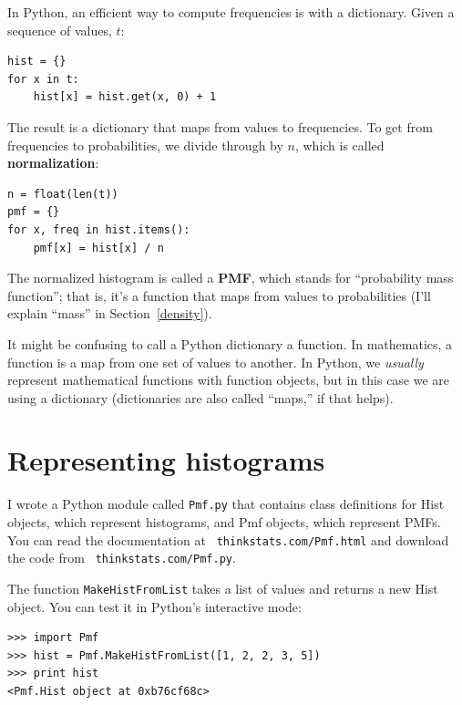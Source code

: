 \documentclass[12pt]{book}
\begin{document}

In Python, an efficient way to compute frequencies is with a dictionary.
Given a sequence of values, $t$:

\begin{verbatim}
hist = {}
for x in t:
    hist[x] = hist.get(x, 0) + 1
\end{verbatim}

The result is a dictionary that maps from values to frequencies.
To get from frequencies to probabilities, we divide through by $n$,
which is called {\bf normalization}:


\begin{verbatim}
n = float(len(t))
pmf = {}
for x, freq in hist.items():
    pmf[x] = hist[x] / n
\end{verbatim}


The normalized histogram is called a {\bf PMF}, which stands for
``probability mass function''; that is, it's a function that maps from
values to probabilities (I'll explain ``mass'' in
Section~\ref{density}).

It might be confusing to call a Python dictionary a function.  In
mathematics, a function is a map from one set of values to
another.  In Python, we {\em usually} represent mathematical functions
with function objects, but in this case we are using a dictionary
(dictionaries are also called ``maps,'' if that helps).



\section{Representing histograms}

I wrote a Python module called {\tt Pmf.py} that contains class
definitions for Hist objects, which represent histograms, and Pmf
objects, which represent PMFs.  You can read the documentation at {\tt
  thinkstats.com/Pmf.html} and download the code from {\tt
  thinkstats.com/Pmf.py}.

The function {\tt MakeHistFromList} takes a list of values and
returns a new Hist object.  You can test it in Python's interactive
mode:

\begin{verbatim}
>>> import Pmf
>>> hist = Pmf.MakeHistFromList([1, 2, 2, 3, 5])
>>> print hist
<Pmf.Hist object at 0xb76cf68c>
\end{verbatim}
\end{document}
